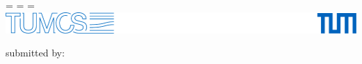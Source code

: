 \begin{titlepage}

  \oddsidemargin=\evensidemargin\relax
  \textwidth=\dimexpr{}\evensidemargin-2in\relax
  \hsize=\textwidth\relax
  \centering
  \includegraphics[width = \textwidth]{logos/test.pdf}



  \vspace{50mm}
  {\LARGE \getDoctype{}}

  \vspace{15mm}
  \makeatletter
  {\LARGE\bfseries \getTitle{}}


  \vspace{25mm}
  {\Large submitted by:}

  \vspace{1mm}
  {\Large \text{\getAuthor{}}}

\end{titlepage}
